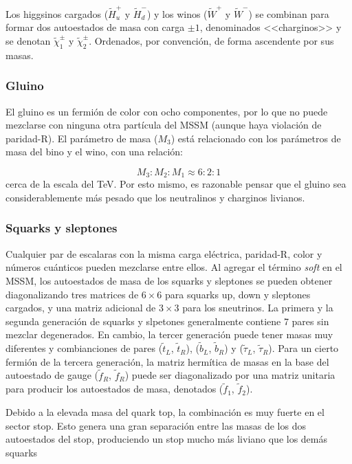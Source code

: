 Los higgsinos cargados ($\widetilde{H}^{+}_{u}$ y $\widetilde{H}^{-}_{d}$) y los winos ($\widetilde{W}^{+}$ y $\widetilde{W}^{-}$) se combinan para formar dos autoestados de masa con carga $\pm1$, denominados <<charginos>> y se denotan $\widetilde{\chi}^{\pm}_{1}$ y $\widetilde{\chi}^{\pm}_{2}$. Ordenados, por convención, de forma ascendente por sus masas.


\subsubsection{Gluino}

El gluino es un fermión de color con ocho componentes, por lo que no puede mezclarse con ninguna otra partícula del MSSM (aunque haya violación de paridad-R). El parámetro de masa ($M_{3}$) está relacionado con los parámetros de masa del bino y el wino, con una relación:

\begin{equation}
M_{3}:M_{2}:M_{1} \approx 6:2:1
\end{equation}
%
cerca de la escala del TeV. Por esto mismo, es razonable pensar que el gluino sea considerablemente más pesado que los neutralinos y charginos livianos.


\subsubsection{Squarks y sleptones}

Cualquier par de escalaras con la misma carga eléctrica, paridad-R, color y números cuánticos pueden mezclarse entre ellos. Al agregar el término \textit{soft} en el MSSM, los autoestados de masa de los squarks y sleptones se pueden obtener diagonalizando tres matrices de $6 \times 6$ para squarks up, down y sleptones cargados, y una matriz adicional de $3 \times 3$ para los sneutrinos. La primera y la segunda generación de squarks y slpetones generalmente contiene 7 pares sin mezclar degenerados. En cambio, la tercer generación puede tener masas muy diferentes y combianciones de pares ($\tilde{t}_{L}$, $\tilde{t}_{R}$), ($\tilde{b}_{L}$, $\tilde{b}_{R}$) y ($\tilde{\tau}_{L}$, $\tilde{\tau}_{R}$). Para un cierto fermión de la tercera generación, la matriz hermítica de masas en la base del autoestado de gauge ($\tilde{f}_{R}$, $\tilde{f}_{R}$) puede ser diagonalizado por una matriz unitaria para producir los autoestados de masa, denotados ($\tilde{f}_{1}$, $\tilde{f}_{2}$).

Debido a la elevada masa del quark top, la combinación es muy fuerte en el sector stop. Esto genera una gran separación entre las masas de los dos autoestados del stop, produciendo un stop mucho más liviano que los demás squarks


